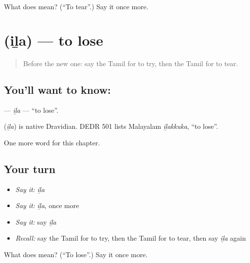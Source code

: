 \begin{tcolorbox}[breakable,colback=teal!4,colframe=teal!35!black,title={Before you move on}]
What does  mean? (\textquotedblleft{}To tear\textquotedblright{}.) Say it once more.
\end{tcolorbox}
\section[\texorpdfstring{\ta{இழ} (iḻa)}{இழ (iḻa)}]{ (iḻa) — to lose}

\label{lesson:TA-C196-ila}



\begin{quote}
Before the new one: say the Tamil for to try, then the Tamil for to tear.
\end{quote}

\subsection*{You'll want to know: }
\textbf{} — \emph{iḻa} — \textquotedblleft{}to lose\textquotedblright{}.

\begin{cousinweb}
\textbf{} (\emph{iḻa}) is native Dravidian. DEDR 501 lists Malayalam \emph{iḻakkuka}, \textquotedblleft{}to lose\textquotedblright{}.
\end{cousinweb}

\begin{grammarlens}[title={What you've built}]
One more word for this chapter.
\end{grammarlens}

\subsection*{Your turn}
\begin{itemize}
\raggedright
  \item \emph{Say it:} \emph{iḻa}
  \item \emph{Say it:} \emph{iḻa}, once more
  \item \emph{Say it:} say \emph{iḻa}
  \item \emph{Recall:} say the Tamil for to try, then the Tamil for to tear, then say \emph{iḻa} again
\end{itemize}

\begin{tcolorbox}[breakable,colback=teal!4,colframe=teal!35!black,title={Before you move on}]
What does  mean? (\textquotedblleft{}To lose\textquotedblright{}.) Say it once more.
\end{tcolorbox}
